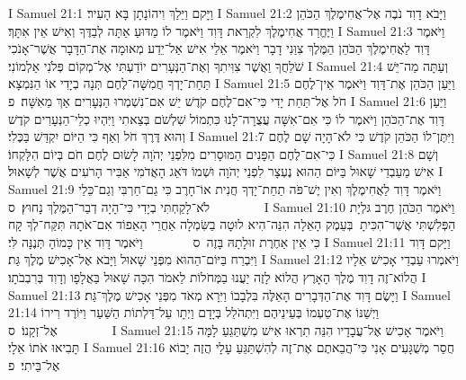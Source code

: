 I Samuel 21:1	וַיָּקם וַיֵּלַךְ וִיהוֹנָתָן בָּא הָעִיר׃
I Samuel 21:2	וַיָּבֹא דָוִד נֹבֶה אֶל־אֲחִימֶלֶךְ הַכֹּהֵן וַיֶּחֱרַד אֲחִימֶלֶךְ לִקְרַאת דָּוִד וַיֹּאמֶר לוֹ מַדּוּעַ אַתָּה לְבַדֶּךָ וְאִישׁ אֵין אִתָּךְ׃
I Samuel 21:3	וַיֹּאמֶר דָּוִד לַאֲחִימֶלֶךְ הַכֹּהֵן הַמֶּלֶךְ צִוַּנִי דָבָר וַיֹּאמֶר אֵלַי אִישׁ אַל־יֵדַע מְאוּמָה אֶת־הַדָּבָר אֲשֶׁר־אָנֹכִי שֹׁלֵחֲךָ וַאֲשֶׁר צִוִּיתִךָ וְאֶת־הַנְּעָרִים יוֹדַעְתִּי אֶל־מְקוֹם פְּלֹנִי אַלְמוֹנִי׃
I Samuel 21:4	וְעַתָּה מַה־יֵּשׁ תַּחַת־יָדְךָ חֲמִשָּׁה־לֶחֶם תְּנָה בְיָדִי אוֹ הַנִּמְצָא׃
I Samuel 21:5	וַיַּעַן הַכֹּהֵן אֶת־דָּוִד וַיֹּאמֶר אֵין־לֶחֶם חֹל אֶל־תַּחַת יָדִי כִּי־אִם־לֶחֶם קֹדֶשׁ יֵשׁ אִם־נִשְׁמְרוּ הַנְּעָרִים אַךְ מֵאִשָּׁה׃ {פ}
I Samuel 21:6	וַיַּעַן דָּוִד אֶת־הַכֹּהֵן וַיֹּאמֶר לוֹ כִּי אִם־אִשָּׁה עֲצֻרָה־לָנוּ כִּתְמוֹל שִׁלְשֹׁם בְּצֵאתִי וַיִּהְיוּ כְלֵי־הַנְּעָרִים קֹדֶשׁ וְהוּא דֶּרֶךְ חֹל וְאַף כִּי הַיּוֹם יִקְדַּשׁ בַּכֶּלִי׃
I Samuel 21:7	וַיִּתֶּן־לוֹ הַכֹּהֵן קֹדֶשׁ כִּי לֹא־הָיָה שָׁם לֶחֶם כִּי־אִם־לֶחֶם הַפָּנִים הַמּוּסָרִים מִלִּפְנֵי יְהֹוָה לָשׂוּם לֶחֶם חֹם בְּיוֹם הִלָּקְחוֹ׃
I Samuel 21:8	וְשָׁם אִישׁ מֵעַבְדֵי שָׁאוּל בַּיּוֹם הַהוּא נֶעְצָר לִפְנֵי יְהֹוָה וּשְׁמוֹ דֹּאֵג הָאֲדֹמִי אַבִּיר הָרֹעִים אֲשֶׁר לְשָׁאוּל׃
I Samuel 21:9	וַיֹּאמֶר דָּוִד לַאֲחִימֶלֶךְ וְאִין יֶשׁ־פֹּה תַחַת־יָדְךָ חֲנִית אוֹ־חָרֶב כִּי גַם־חַרְבִּי וְגַם־כֵּלַי לֹא־לָקַחְתִּי בְיָדִי כִּי־הָיָה דְבַר־הַמֶּלֶךְ נָחוּץ׃ {ס}        
I Samuel 21:10	וַיֹּאמֶר הַכֹּהֵן חֶרֶב גּלְיָת הַפְּלִשְׁתִּי אֲשֶׁר־הִכִּיתָ  בְּעֵמֶק הָאֵלָה הִנֵּה־הִיא לוּטָה בַשִּׂמְלָה אַחֲרֵי הָאֵפוֹד אִם־אֹתָהּ תִּקַּח־לְךָ קָח כִּי אֵין אַחֶרֶת זוּלָתָהּ בָּזֶה {ס}        וַיֹּאמֶר דָּוִד אֵין כָּמוֹהָ תְּנֶנָּה לִּי׃
I Samuel 21:11	וַיָּקם דָּוִד וַיִּבְרַח בַּיּוֹם־הַהוּא מִפְּנֵי שָׁאוּל וַיָּבֹא אֶל־אָכִישׁ מֶלֶךְ גַּת׃
I Samuel 21:12	וַיֹּאמְרוּ עַבְדֵי אָכִישׁ אֵלָיו הֲלוֹא־זֶה דָוִד מֶלֶךְ הָאָרֶץ הֲלוֹא לָזֶה יַעֲנוּ בַמְּחֹלוֹת לֵאמֹר הִכָּה שָׁאוּל בַּאֲלָפָו וְדָוִד בְּרִבְבֹתָו׃
I Samuel 21:13	וַיָּשֶׂם דָּוִד אֶת־הַדְּבָרִים הָאֵלֶּה בִּלְבָבוֹ וַיִּרָא מְאֹד מִפְּנֵי אָכִישׁ מֶלֶךְ־גַּת׃
I Samuel 21:14	וַיְשַׁנּוֹ אֶת־טַעְמוֹ בְּעֵינֵיהֶם וַיִּתְהֹלֵל בְּיָדָם וַיְתָו עַל־דַּלְתוֹת הַשַּׁעַר וַיּוֹרֶד רִירוֹ אֶל־זְקָנוֹ׃ {ס}        
I Samuel 21:15	וַיֹּאמֶר אָכִישׁ אֶל־עֲבָדָיו הִנֵּה תִרְאוּ אִישׁ מִשְׁתַּגֵּעַ לָמָּה תָּבִיאוּ אֹתוֹ אֵלָי׃
I Samuel 21:16	חֲסַר מְשֻׁגָּעִים אָנִי כִּי־הֲבֵאתֶם אֶת־זֶה לְהִשְׁתַּגֵּעַ עָלָי הֲזֶה יָבוֹא אֶל־בֵּיתִי׃ {פ}
